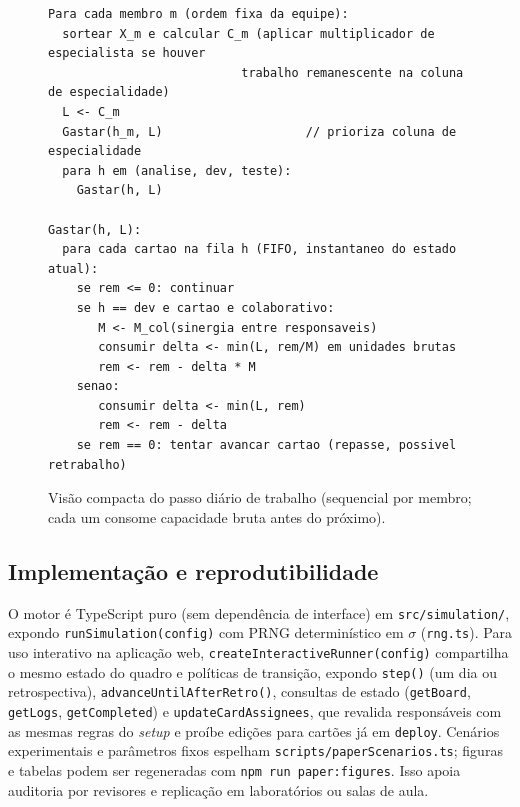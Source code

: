 \begin{figure}[htbp]
  \centering
  \begin{minipage}{0.92\linewidth}
  \small
  \begin{verbatim}
Para cada membro m (ordem fixa da equipe):
  sortear X_m e calcular C_m (aplicar multiplicador de especialista se houver
                           trabalho remanescente na coluna de especialidade)
  L <- C_m
  Gastar(h_m, L)                    // prioriza coluna de especialidade
  para h em (analise, dev, teste):
    Gastar(h, L)

Gastar(h, L):
  para cada cartao na fila h (FIFO, instantaneo do estado atual):
    se rem <= 0: continuar
    se h == dev e cartao e colaborativo:
       M <- M_col(sinergia entre responsaveis)
       consumir delta <- min(L, rem/M) em unidades brutas
       rem <- rem - delta * M
    senao:
       consumir delta <- min(L, rem)
       rem <- rem - delta
    se rem == 0: tentar avancar cartao (repasse, possivel retrabalho)
\end{verbatim}
  \end{minipage}
  \caption{Visão compacta do passo diário de trabalho (sequencial por membro; cada um consome capacidade bruta antes do próximo).}
  \label{fig:pseudo}
\end{figure}

\subsection{Implementação e reprodutibilidade}
O motor é TypeScript puro (sem dependência de interface) em \texttt{src/simulation/}, expondo \texttt{runSimulation(config)} com PRNG determinístico em $\sigma$ (\texttt{rng.ts}). Para uso interativo na aplicação web, \texttt{createInteractiveRunner(config)} compartilha o mesmo estado do quadro e políticas de transição, expondo \texttt{step()} (um dia ou retrospectiva), \texttt{advanceUntilAfterRetro()}, consultas de estado (\texttt{getBoard}, \texttt{getLogs}, \texttt{getCompleted}) e \texttt{updateCardAssignees}, que revalida responsáveis com as mesmas regras do \emph{setup} e proíbe edições para cartões já em \texttt{deploy}. Cenários experimentais e parâmetros fixos espelham \texttt{scripts/paperScenarios.ts}; figuras e tabelas podem ser regeneradas com \texttt{npm run paper:figures}. Isso apoia auditoria por revisores e replicação em laboratórios ou salas de aula.
